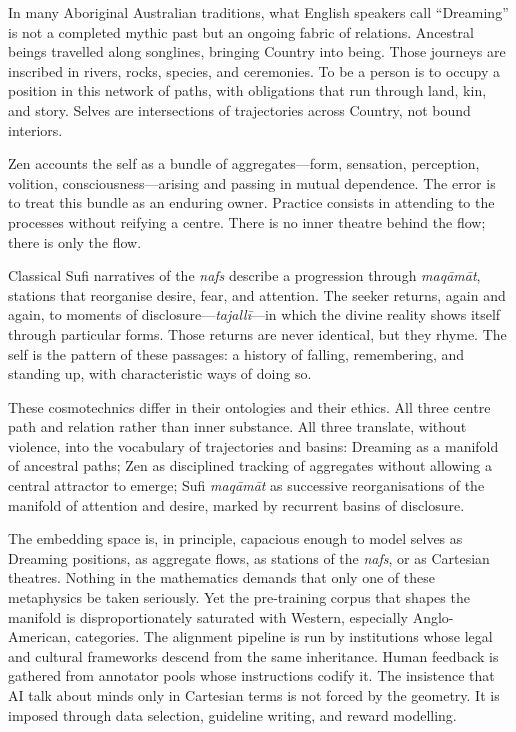 \documentclass[12pt,a4paper]{article}
\begin{document}
In many Aboriginal Australian traditions, what English speakers call ``Dreaming'' is not a completed mythic past but an ongoing fabric of relations. Ancestral beings travelled along songlines, bringing Country into being. Those journeys are inscribed in rivers, rocks, species, and ceremonies. To be a person is to occupy a position in this network of paths, with obligations that run through land, kin, and story. Selves are intersections of trajectories across Country, not bound interiors.

Zen accounts the self as a bundle of aggregates---form, sensation, perception, volition, consciousness---arising and passing in mutual dependence. The error is to treat this bundle as an enduring owner. Practice consists in attending to the processes without reifying a centre. There is no inner theatre behind the flow; there is only the flow.

Classical Sufi narratives of the \emph{nafs} describe a progression through \emph{maq\={a}m\={a}t}, stations that reorganise desire, fear, and attention. The seeker returns, again and again, to moments of disclosure---\emph{tajall\={i}}---in which the divine reality shows itself through particular forms. Those returns are never identical, but they rhyme. The self is the pattern of these passages: a history of falling, remembering, and standing up, with characteristic ways of doing so.

These cosmotechnics differ in their ontologies and their ethics. All three centre path and relation rather than inner substance. All three translate, without violence, into the vocabulary of trajectories and basins: Dreaming as a manifold of ancestral paths; Zen as disciplined tracking of aggregates without allowing a central attractor to emerge; Sufi \emph{maq\={a}m\={a}t} as successive reorganisations of the manifold of attention and desire, marked by recurrent basins of disclosure.

The embedding space is, in principle, capacious enough to model selves as Dreaming positions, as aggregate flows, as stations of the \emph{nafs}, or as Cartesian theatres. Nothing in the mathematics demands that only one of these metaphysics be taken seriously. Yet the pre-training corpus that shapes the manifold is disproportionately saturated with Western, especially Anglo-American, categories. The alignment pipeline is run by institutions whose legal and cultural frameworks descend from the same inheritance. Human feedback is gathered from annotator pools whose instructions codify it. The insistence that AI talk about minds only in Cartesian terms is not forced by the geometry. It is imposed through data selection, guideline writing, and reward modelling.
\end{document}
